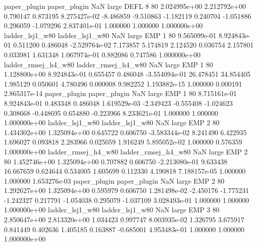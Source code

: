        paper_plugin        paper_plugin                   NaN      large     DEFL                 8 80 2.024995e+00   2.212792e+00      0.790147       0.873195  8.275427e-02     -8.486859     -9.510863    -1.182119       0.240704 -1.051886   0.296059    -1.079296   2.837401e-01            1.000000        1.000000        1.000000e+00
    ladder_lsj1_w80     ladder_lsj1_w80                   NaN      large      EMP                 1 80 9.565099e-01   8.924843e-01      0.511200       0.486048 -2.529764e-02      7.173857      5.174819     2.124520       0.036754  2.157801   0.033981     1.631348   1.067974e-01            0.882086        0.747586        1.000000e+00
ladder_rmsej_h4_w80 ladder_rmsej_h4_w80                   NaN      large      EMP                 1 80 1.128800e+00   8.924843e-01      0.655457       0.486048 -3.554094e-01     26.478451     34.854405     1.985129       0.050601  4.780496   0.000008     9.982252   1.193882e-15            1.000000        0.000191        2.865317e-14
       paper_plugin        paper_plugin                   NaN      large      EMP                 1 80 8.715161e-01   8.924843e-01      0.483348       0.486048  1.619529e-03     -2.349423     -0.555408    -1.024623       0.308668 -0.448695   0.654880    -0.223966   8.233621e-01            1.000000        1.000000        1.000000e+00
    ladder_lsj1_w80     ladder_lsj1_w80                   NaN      large      EMP                 2 80 1.434302e+00   1.325094e+00      0.645722       0.606750 -3.583344e-02      8.241490      6.422935     1.696027       0.093818  2.283966   0.025059     1.916249   5.895052e-02            1.000000        0.576359        1.000000e+00
ladder_rmsej_h4_w80 ladder_rmsej_h4_w80                   NaN      large      EMP                 2 80 1.452746e+00   1.325094e+00      0.707882       0.606750 -2.213080e-01      9.633438     16.667659     0.624644       0.534005  1.605699   0.112330     4.190818   7.188157e-05            1.000000        1.000000        1.653276e-03
       paper_plugin        paper_plugin                   NaN      large      EMP                 2 80 1.292627e+00   1.325094e+00      0.595979       0.606750  1.281498e-02     -2.450176     -1.775231    -1.242327       0.217791 -1.054038   0.295079    -1.037109   3.028493e-01            1.000000        1.000000        1.000000e+00
    ladder_lsj1_w80     ladder_lsj1_w80                   NaN      large      EMP                 3 80 2.850647e+00   2.813320e+00      1.034423       0.997747  8.003935e-02      1.326795      3.675917     0.841449       0.402636  1.405185   0.163887    -0.685001   4.953483e-01            1.000000        1.000000        1.000000e+00
